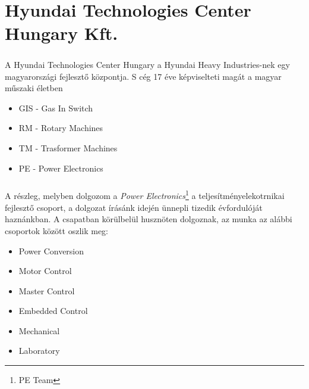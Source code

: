 \chapter*{Hyundai Technologies Center Hungary Kft.}

\paragraph{}
A Hyundai Technologies Center Hungary a Hyundai Heavy Industries-nek egy magyarországi fejlesztő központja. S cég 17 éve képviselteti magát a magyar műszaki életben


\begin{itemize}
	\item{GIS - Gas In Switch}
	\item{RM - Rotary Machines}
	\item{TM - Trasformer Machines}
	\item{PE - Power Electronics}
\end{itemize}


\paragraph{}
A részleg, melyben dolgozom a \emph{Power Electronics}\footnote{PE Team} a teljesítményelekotrnikai fejlesztő csoport, a dolgozat írásánk idején ünnepli tizedik évfordulóját haznánkban. A csapatban körülbelül husznöten dolgoznak, az munka az alábbi csoportok között oszlik meg:

\begin{itemize}
	\item{Power Conversion}
	\item{Motor Control}
	\item{Master Control}
	\item{Embedded Control}
	\item{Mechanical}
	\item{Laboratory} 
\end{itemize}

